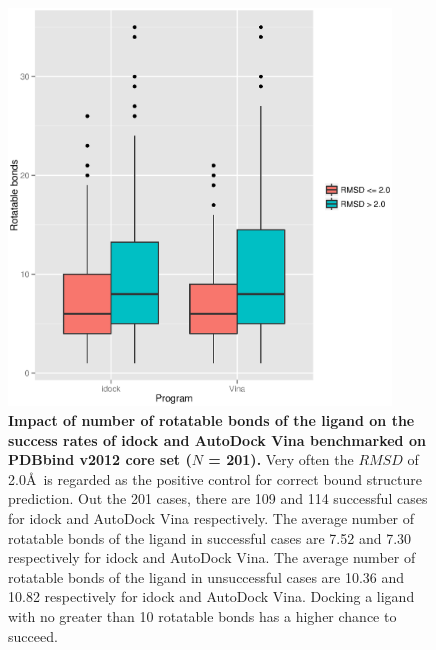 \documentclass[10pt]{article}
\begin{document}
\begin{figure}[!ht]
\begin{center}
\includegraphics[width=4in]{Program-NRB.eps}
\end{center}
\caption{
{\bf Impact of number of rotatable bonds of the ligand on the success rates of idock and AutoDock Vina benchmarked on PDBbind v2012 core set ($N$ = 201).} Very often the $RMSD$ of 2.0\AA\ is regarded as the positive control for correct bound structure prediction. Out the 201 cases, there are 109 and 114 successful cases for idock and AutoDock Vina respectively. The average number of rotatable bonds of the ligand in successful cases are 7.52 and 7.30 respectively for idock and AutoDock Vina. The average number of rotatable bonds of the ligand in unsuccessful cases are 10.36 and 10.82 respectively for idock and AutoDock Vina. Docking a ligand with no greater than 10 rotatable bonds has a higher chance to succeed.
}
\label{Program-NRB}
\end{figure}
\end{document}
